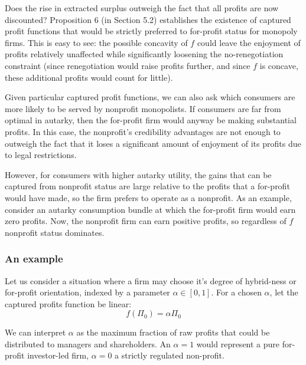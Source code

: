 \documentclass[11pt,english]{article}
\theoremstyle{plain}
\theoremstyle{definition}
\begin{document}
Does the rise in extracted surplus outweigh the fact that all profits
are now discounted? Proposition 6 (in Section 5.2) establishes the
existence of captured profit functions that would be strictly preferred
to for-profit status for monopoly firms. This is easy to see: the
possible concavity of $f$ could leave the enjoyment of profits relatively
unaffected while significantly loosening the no-renegotiation constraint
(since renegotiation would raise profits further, and since $f$ is
concave, these additional profits would count for little).

Given particular captured profit functions, we can also ask which
consumers are more likely to be served by nonprofit monopolists. If
consumers are far from optimal in autarky, then the for-profit firm
would anyway be making substantial profits. In this case, the nonprofit's
credibility advantages are not enough to outweigh the fact that it
loses a significant amount of enjoyment of its profits due to legal
restrictions.

However, for consumers with higher autarky utility, the gains that
can be captured from nonprofit status are large relative to the profits
that a for-profit would have made, so the firm prefers to operate
as a nonprofit. As an example, consider an autarky consumption bundle
at which the for-profit firm would earn zero profits. Now, the nonprofit
firm can earn positive profits, so regardless of $f$ nonprofit status
dominates.

\subsubsection{An example}

Let us consider a situation where a firm may choose it's degree of
hybrid-ness or for-profit orientation, indexed by a parameter $\alpha\in\left[0,1\right]$.
For a chosen $\alpha$, let the captured profits function be linear:
\begin{equation}
f\left(\Pi_{0}\right)=\alpha\Pi_{0}
\end{equation}

We can interpret $\alpha$ as the maximum fraction of raw profits
that could be distributed to managers and shareholders. An $\alpha=1$
would represent a pure for-profit investor-led firm, $\alpha=0$ a
strictly regulated non-profit.
\end{document}
